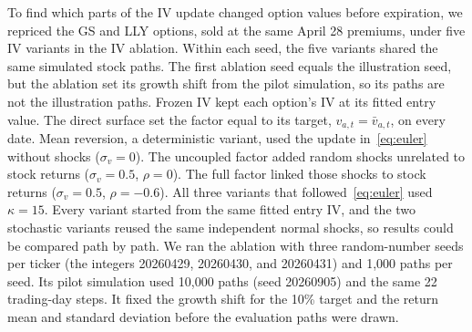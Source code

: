 To find which parts of the IV update changed option values before expiration, we repriced the GS and LLY options, sold at the same April 28 premiums, under five IV variants in the IV ablation. Within each seed, the five variants shared the same simulated stock paths. The first ablation seed equals the illustration seed, but the ablation set its growth shift from the pilot simulation, so its paths are not the illustration paths. Frozen IV kept each option's IV at its fitted entry value. The direct surface set the factor equal to its target, $v_{a,t}=\bar v_{a,t}$, on every date. Mean reversion, a deterministic variant, used the update in~\eqref{eq:euler} without shocks ($\sigma_v=0$). The uncoupled factor added random shocks unrelated to stock returns ($\sigma_v=0.5$, $\rho=0$). The full factor linked those shocks to stock returns ($\sigma_v=0.5$, $\rho=-0.6$). All three variants that followed~\eqref{eq:euler} used $\kappa=15$. Every variant started from the same fitted entry IV, and the two stochastic variants reused the same independent normal shocks, so results could be compared path by path. We ran the ablation with three random-number seeds per ticker (the integers 20260429, 20260430, and 20260431) and 1{,}000 paths per seed. Its pilot simulation used 10{,}000 paths (seed 20260905) and the same 22 trading-day steps. It fixed the growth shift for the 10\% target and the return mean and standard deviation before the evaluation paths were drawn.

